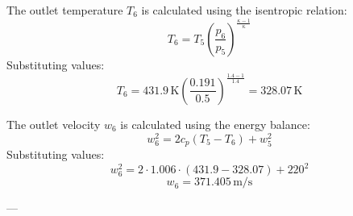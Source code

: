 The outlet temperature \( T_6 \) is calculated using the isentropic relation:  
\[
T_6 = T_5 \left( \frac{p_6}{p_5} \right)^{\frac{\kappa - 1}{\kappa}}
\]  
Substituting values:  
\[
T_6 = 431.9 \, \text{K} \left( \frac{0.191}{0.5} \right)^{\frac{1.4 - 1}{1.4}} = 328.07 \, \text{K}
\]  

The outlet velocity \( w_6 \) is calculated using the energy balance:  
\[
w_6^2 = 2 c_p (T_5 - T_6) + w_5^2
\]  
Substituting values:  
\[
w_6^2 = 2 \cdot 1.006 \cdot (431.9 - 328.07) + 220^2
\]  
\[
w_6 = 371.405 \, \text{m/s}
\]  

---